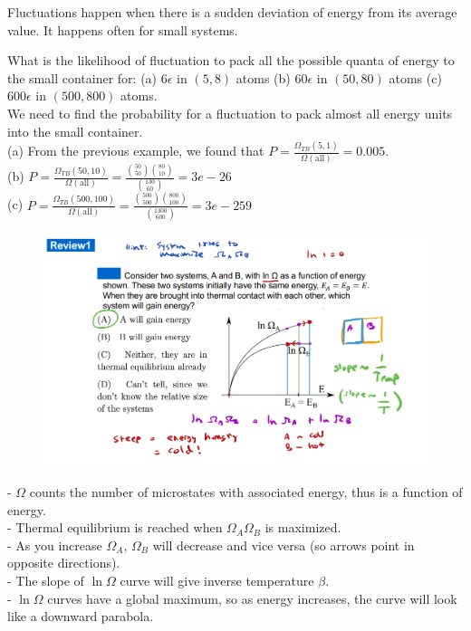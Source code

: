 Fluctuations happen when there is a sudden deviation of energy from its average value. It happens often for small systems. \\

\begin{texample}
	What is the likelihood of fluctuation to pack all the possible quanta of energy to the small container for: (a) $6\epsilon$ in $(5,8)$ atoms (b) $60\epsilon$ in $(50,80)$ atoms (c) $600\epsilon$ in $(500,800)$ atoms. \\
	
	We need to find the probability for a fluctuation to pack almost all energy units into the small container. \\
	
	(a) From the previous example, we found that $P=\frac{\Omega_{TB} (5,1)}{\Omega (\text{all})}=0.005$. \\
	
	(b) $P=\frac{\Omega_{TB} (50,10)}{\Omega (\text{all})}=\frac{\binom{50}{50}\binom{80}{10}}{\binom{130}{60}}=3e-26$ \\
	
	(c) $P=\frac{\Omega_{TB} (500,100)}{\Omega (\text{all})}=\frac{\binom{500}{500}\binom{800}{100}}{\binom{1300}{600}}=3e-259$
\end{texample}

\begin{texample}
	\begin{figure}[H]
		\centering
		\includegraphics[width=120mm]{11.png}
	\end{figure}
	
	- $\Omega$ counts the number of microstates with associated energy, thus is a function of energy. \\
	
	- Thermal equilibrium is reached when $\Omega_A\Omega_B$ is maximized. \\
	
	- As you increase $\Omega_A$, $\Omega_B$ will decrease and vice versa (so arrows point in opposite directions). \\
	
	- The slope of $\ln\Omega$ curve will give inverse temperature $\beta$. \\
	
	- $\ln\Omega$ curves have a global maximum, so as energy increases, the curve will look like a downward parabola.
\end{texample}

